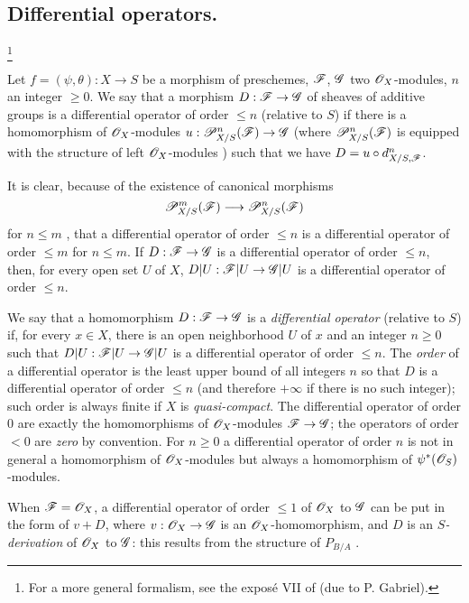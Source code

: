 \subsection{Differential operators.}
\footnote{
  For a more general formalism, see the expos\'e VII of \cite{IV-42} (due to P. Gabriel).
}
\label{IV.16.8}

\begin{definition}[16.8.1]
\label{IV.16.8.1}
Let $f = (\psi, \theta): X \to S$ be a morphism of preschemes, $\mathscr{F}$, $\mathscr{G}$ two $\mathscr{O}_X$-modules, $n$ an integer $\geq 0$.
We say that a morphism $D: \sh{F} \to \sh{G}$ of sheaves of additive groups is a differential operator of order $\leq n$ (relative to $S$) if there is a homomorphism of $\mathscr{O}_X$-modules $u: \sh{P}_{X/S}^n(\sh{F}) \to \sh{G}$ (where $\mathscr{P}_{X/S}^n(\mathscr{F})$ is equipped with the structure of left $\mathscr{O}_X$-modules ) such that we have $D = u \circ d_{X/S, \mathscr{F}}^n$.
\end{definition}

It is clear, because of the existence of canonical morphisms
\[
  \sh{P}_{X/S}^m(\sh{F}) \to \sh{P}_{X/S}^n(\sh{F})
\] 
for $n \leq m$ , that a differential operator of order $\leq n$ is a differential operator of order $\leq m$ for $n \leq m$.
If $D:\sh{F} \to \sh{G}$ is a differential operator of order $\leq n$, then, for every open set $U$ of $X$, $D|U: \sh{F}|U \to \sh{G}|U$ is a differential operator of order $\leq n$.

We say that a homomorphism $D: \sh{F} \to \sh{G}$ is a \emph{differential operator} (relative to $S$) if, for every $x \in X$, there is an open neighborhood $U$ of $x$ and an integer $n \geq 0$ such that $D|U: \sh{F}|U \to \sh{G}|U$ is a differential operator of order $\leq n$.
The \emph{order} of a differential operator is the least upper bound of all integers $n$ so that $D$ is a differential operator of order $\leq n$ (and therefore $+\infty$ if there is no such integer);
such order is always finite if $X$ is \emph{quasi-compact}.
The differential operator of order $0$ are exactly the homomorphisms of $\mathscr{O}_X$-modules $\sh{F} \to \sh{G}$;
the operators of order $<0$ are \emph{zero} by convention.
For $n \geq 0$ a differential operator of order $n$ is not in general a homomorphism of $\mathscr{O}_X$-modules but always a homomorphism of $\psi^*(\mathscr{O}_S)$-modules.

When $\mathscr{F} = \mathscr{O}_X$, a differential operator of order $\leq 1$ of $\mathscr{O}_X$ to $\mathscr{G}$ can be put in the form of $v + D$, where $v: \sh{O}_X \to \sh{G}$ is an $\mathscr{O}_X$-homomorphism, and $D$ is an \emph{$S$-derivation}  of $\mathscr{O}_X$ to $\mathscr{G}$: this results from the structure of $P_{B/A}$ .

